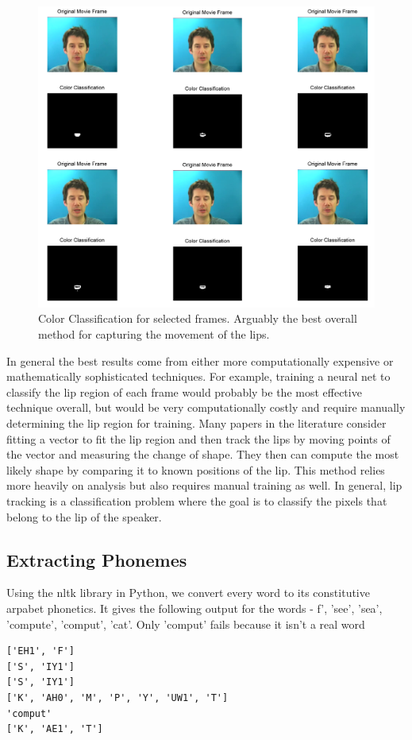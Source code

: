 \documentclass[a4paper,11pt]{article}
\begin{document}
\begin{figure}[!ht]
	\includegraphics[width=1\textwidth, height=0.75\textwidth]{color1.png}
 \caption{Color Classification for selected frames. Arguably the best overall method for capturing the movement of the lips.}
\end{figure}


In general the best results come from either more computationally expensive or mathematically sophisticated techniques. For example, training a neural net to classify the lip region of each frame would probably be the most effective technique overall, but would be very computationally costly and require manually determining the lip region for training. Many papers in the literature consider fitting a vector to fit the lip region and then track the lips by moving points of the vector and measuring the change of shape. They then can compute the most likely shape by comparing it to known positions of the lip. This method relies more heavily on analysis but also requires manual training as well. In general, lip tracking is a classification problem where the goal is to classify the pixels that belong to the lip of the speaker. 

\subsection{Extracting Phonemes}

Using the nltk library in Python, we convert every word to its constitutive arpabet phonetics. It gives the following output for the words - f', 'see', 'sea', 'compute', 'comput', 'cat'. Only 'comput' fails because it isn't a real word
\begin{verbatim}
['EH1', 'F']
['S', 'IY1']
['S', 'IY1']
['K', 'AH0', 'M', 'P', 'Y', 'UW1', 'T']
'comput'
['K', 'AE1', 'T']
\end{verbatim}
\end{document}
